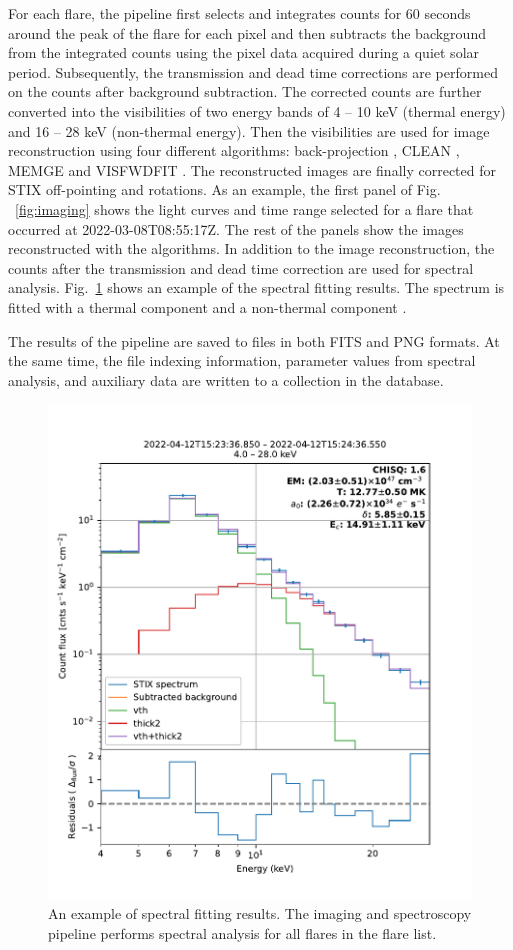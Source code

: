 \documentclass[referee]{preaa} %
\begin{document}
 For each flare, the pipeline first selects and integrates counts for 60 seconds around the peak of the flare for each pixel and then subtracts the background from the integrated counts using the pixel data acquired during a quiet solar period. 
 Subsequently, the transmission and dead time corrections are performed on the counts after background subtraction. The corrected counts are further converted into the visibilities of two energy bands of 4 -- 10 keV (thermal energy) and 16 -- 28 keV (non-thermal energy). 
Then the visibilities are used for image reconstruction using four different algorithms: back-projection \citep{paolo2022}, CLEAN \cite{clean}, MEM\textunderscore GE \citep{mem, memge} and VIS\textunderscore FWDFIT \citep{visfwd}.
The reconstructed images are finally corrected  for STIX off-pointing and rotations. 
As an example,  the first panel of Fig. ~\ref{fig:imaging} shows the light curves and time range selected for a flare that occurred at 2022-03-08T08:55:17Z. The rest of the panels show the images reconstructed with the algorithms. 
In addition to the image reconstruction, the counts after the transmission and dead time correction are used for spectral analysis.  Fig.~\ref{fig:ospex} shows an example of the spectral fitting results. The spectrum is fitted with a thermal component and a non-thermal component \citep{andrea2021}. 

The results of the pipeline are saved to files in both FITS and PNG formats. At the same time, the file indexing information, parameter values from spectral analysis, and auxiliary data are written to a collection in the database. 


\begin{figure}[h]
  \centering
  \includegraphics[width=0.9\linewidth]{figures/ospex.pdf}
  \caption{An example of spectral fitting results. 
    The imaging and spectroscopy pipeline performs
    spectral analysis for all flares in the flare list. }
  \label{fig:ospex}
\end{figure}
\end{document}

